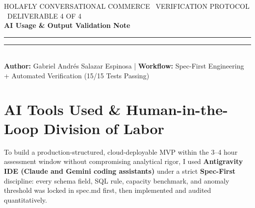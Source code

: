 \documentclass[10pt,letterpaper]{article}
\newcommand{\eyebrow}[1]{{\fontfamily{pcr}\selectfont\fontsize{7.2}{8.5}\selectfont\color{graphite}\MakeUppercase{#1}}}
\newcommand{\code}[1]{{\fontfamily{pcr}\selectfont\footnotesize\color{ink}#1}}
\begin{document}
\fontsize{8.5}{10.9}\selectfont

\eyebrow{Holafly Conversational Commerce \textperiodcentered\ Verification Protocol \textperiodcentered\ Deliverable 4 of 4}\\[1.5pt]
{\fontsize{14.8}{17}\selectfont\bfseries\color{ink}AI Usage \& Output Validation Note}\\[2.5pt]
{\color{holaflyred}\rule{1.40in}{1.8pt}}{\color{hairline}\rule{\dimexpr\textwidth-1.40in\relax}{0.6pt}}\\[2.5pt]
{\fontsize{8.0}{9.6}\selectfont\color{iron}%
\textbf{Author:} Gabriel Andr\'es Salazar Espinosa \quad|\quad
\textbf{Workflow:} Spec-First Engineering + Automated Verification (15/15 Tests Passing)}

\section{AI Tools Used \& Human-in-the-Loop Division of Labor}
To build a production-structured, cloud-deployable MVP within the 3--4 hour assessment window without compromising analytical rigor, I used \textbf{Antigravity IDE (Claude and Gemini coding assistants)} under a strict \textbf{Spec-First} discipline: every schema field, SQL rule, capacity benchmark, and anomaly threshold was locked in \code{spec.md} first, then implemented and audited quantitatively.
\end{document}
